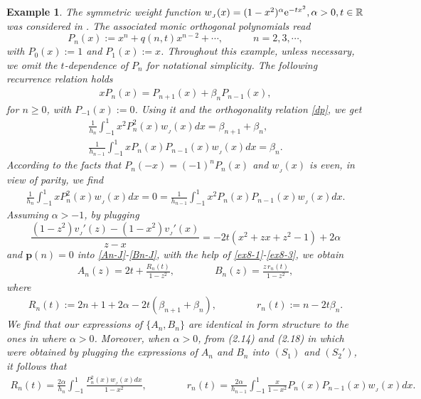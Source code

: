 \documentclass[12pt,a4paper]{article}    %
\newcommand{\e}{{\rm e}}
\newtheorem{exm}{Example}
\numberwithin{equation}{section}
\begin{document}
\begin{exm}\label{ex-J3}
The symmetric weight function $w_{_J}(x)=(1-x^2)^{\alpha}\e^{-tx^2},\alpha>0,t\in\mathbb{R}$ was considered in \cite{MinChen22}. The associated monic orthogonal polynomials read
\[P_n(x):=x^n+q(n,t)x^{n-2}+\cdots, \quad\qquad n=2,3,\cdots,\]
with $P_0(x):=1$ and $P_1(x):=x$. Throughout this example, unless necessary, we omit the $t$-dependence of $P_n$ for notational simplicity. The following recurrence relation holds
\begin{align*}
xP_{n}(x)=P_{n+1}(x)+\beta_nP_{n-1}(x),
\end{align*}
for $n\geq0$, with $P_{-1}(x):=0$.
Using it and the orthogonality relation \eqref{dp}, we get
\begin{gather}
\frac{1}{h_n}\int_{-1}^1x^2P_n^2(x)w_{_J}(x)dx=\beta_{n+1}+\beta_{n},\label{ex8-1}\\
\frac{1}{h_{n-1}}\int_{-1}^1xP_n(x)P_{n-1}(x)w_{_J}(x)dx=\beta_n.\label{ex8-2}
\end{gather}
According to the facts that $P_n(-x)=(-1)^nP_n(x)$ and $w_{_J}(x)$ is even, in view of parity, we find
\begin{align}\label{ex8-3}
\frac{1}{h_n}\int_{-1}^1xP_n^2(x)w_{_J}(x)dx=0=
\frac{1}{h_{n-1}}\int_{-1}^1x^2P_n(x)P_{n-1}(x)w_{_J}(x)dx.
\end{align}
Assuming $\alpha>-1$, by plugging
\[\frac{(1-z^2)v_{_J}'(z)-(1-x^2)v_{_J}'(x)}{z-x}=-2t(x^2+zx+z^2-1)+2\alpha
\]
and $\mathbf{p}(n)=0$ into \eqref{An-J}-\eqref{Bn-J}, with the help of \eqref{ex8-1}-\eqref{ex8-3}, we obtain
\begin{equation}\label{AnBn-J-3}
\begin{aligned}
A_n(z)=2t+\frac{R_n(t)}{1-z^2},\qquad\qquad B_n(z)=\frac{z\,r_n(t)}{1-z^2},
\end{aligned}
\end{equation}
where
\begin{align}\label{defRnrn-ex8}
R_n(t):=2n+1+2\alpha-2t(\beta_{n+1}+\beta_n),\qquad\qquad r_n(t):=n-2t\beta_n.
\end{align}
We find that our expressions of $\{A_n, B_n\}$ are identical in form structure to the ones in \cite{MinChen22} where $\alpha>0$. Moreover, when $\alpha>0$, from (2.14) and (2.18) in \cite{MinChen22} which were obtained by plugging the expressions of $A_n$ and $B_n$ into $(S_1)$ and $(S_2')$, it follows that
\begin{align*}
R_n(t)=\frac{2\alpha}{h_n}\int_{-1}^1\frac{P_n^2(x)w_{_J}(x)dx}{1-x^2},\qquad\qquad r_n(t)=\frac{2\alpha}{h_{n-1}}\int_{-1}^1\frac{x}{1-x^2}P_n(x)P_{n-1}(x)w_{_J}(x)dx.
\end{align*}


\end{exm}
\end{document}
